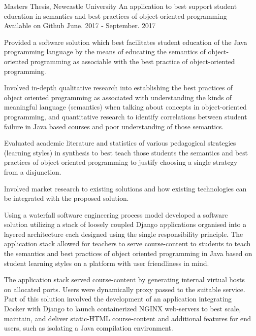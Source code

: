

\begin{cventries}

  \cventry
    {Masters Thesis, Newcastle University} %
    {An application to best support student education in semantics and best practices of object-oriented programming} %
    {Available on Github} %
    {June. 2017 - September. 2017} %
    {
      \begin{cvitems} %
	\item {Provided a software solution which best facilitates student education of the Java programming language by the means of educating
the semantics of object-oriented programming as associable with the best practice of object-oriented programming.}
  \item {Involved in-depth qualitative research into establishing the best practices of object oriented programming as associated with understanding the kinds of meaningful language (semantics) when talking about concepts in object-oriented programming, and quantitative research to identify correlations between student failure in Java based courses and poor understanding of those semantics.}
  \item{Evaluated academic literature and statistics of various pedagogical strategies (learning styles) in synthesis to best teach those students the semantics and best practices of object oriented programming to justify choosing a single strategy from a disjunction.} 
  \item {Involved market research to existing solutions and how existing technologies can be integrated with the proposed solution.}
  \item{Using a waterfall software engineering process model developed a software solution utilizing a stack of loosely coupled Django applications organised into a layered architecture each designed using the single responsibility principle. The application stack allowed for teachers to serve course-content to students to teach the semantics and best practices of object oriented programming in Java based on student learning styles on a platform with user friendliness in mind.}
  \item{The application stack served course-content by generating internal virtual hosts on allocated ports. Users were dynamically proxy passed to the suitable service. Part of this solution involved the development of an application integrating Docker with Django to launch containerized NGINX web-servers to best scale, maintain, and deliver static-HTML course-content and additional features for end users, such as isolating a Java compilation environment.}
      \end{cvitems}
    }


\end{cventries}
